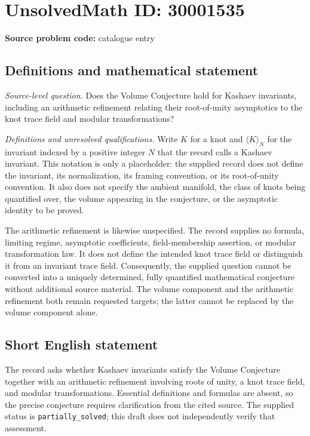\documentclass[11pt]{article}
\begin{document}
\section*{UnsolvedMath ID: 30001535}
\textbf{Source problem code:} catalogue entry
\subsection{Definitions and mathematical statement}
\emph{Source-level question.} Does the Volume Conjecture hold for Kashaev invariants, including an arithmetic refinement relating their root-of-unity asymptotics to the knot trace field and modular transformations?

\emph{Definitions and unresolved qualifications.} Write $K$ for a knot and $\langle K\rangle_N$ for the invariant indexed by a positive integer $N$ that the record calls a Kashaev invariant. This notation is only a placeholder: the supplied record does not define the invariant, its normalization, its framing convention, or its root-of-unity convention. It also does not specify the ambient manifold, the class of knots being quantified over, the volume appearing in the conjecture, or the asymptotic identity to be proved.

The arithmetic refinement is likewise unspecified. The record supplies no formula, limiting regime, asymptotic coefficients, field-membership assertion, or modular transformation law. It does not define the intended knot trace field or distinguish it from an invariant trace field. Consequently, the supplied question cannot be converted into a uniquely determined, fully quantified mathematical conjecture without additional source material. The volume component and the arithmetic refinement both remain requested targets; the latter cannot be replaced by the volume component alone.
\subsection{Short English statement}
The record asks whether Kashaev invariants satisfy the Volume Conjecture together with an arithmetic refinement involving roots of unity, a knot trace field, and modular transformations. Essential definitions and formulas are absent, so the precise conjecture requires clarification from the cited source. The supplied status is \texttt{partially\_solved}; this draft does not independently verify that assessment.
\end{document}
